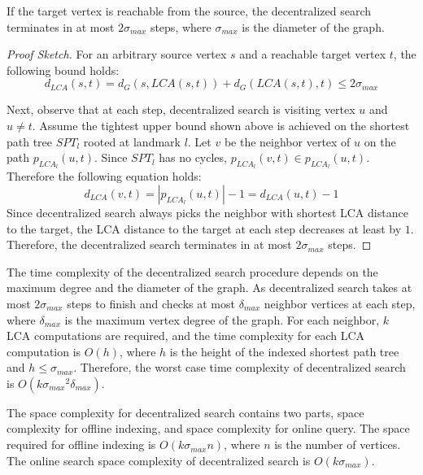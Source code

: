 \begin{theorem}
\label{theorem:max_step}
If the target vertex is reachable from the source, the decentralized search terminates in at most $2{\sigma}_{max}$ steps, where ${\sigma}_{max}$ is the diameter of the graph.
\end{theorem}
\begin{proof}[Proof Sketch]
For an arbitrary source vertex $s$ and a reachable target vertex $t$, the following bound holds:
\[
    d_{LCA}(s,t) = d_G(s,LCA(s,t)) + d_G(LCA(s,t),t) \leq 2{\sigma}_{max}
\]

Next, observe that at each step, decentralized search is visiting vertex $u$ and $u \neq t$. Assume the tightest upper bound shown above is achieved on the shortest path tree $SPT_l$ rooted at landmark $l$. Let $v$ be the neighbor vertex of $u$ on the path $p_{LCA_l}(u,t)$. Since $SPT_l$ has no cycles, $p_{LCA_l}(v,t) \in p_{LCA_l}(u,t)$. Therefore the following equation holds:
\[
		d_{LCA}(v,t) = |p_{LCA_l}(u,t)| - 1 = d_{LCA}(u,t) - 1
\]
Since decentralized search always picks the neighbor with shortest LCA distance to the target, the LCA distance to the target at each step decreases at least by $1$. Therefore, the decentralized search terminates in at most $2{\sigma}_{max}$ steps.
\end{proof}

The time complexity of the decentralized search procedure depends on the maximum degree and the diameter of the graph. As decentralized search takes at most $2{\sigma}_{max}$ steps to finish and checks at most ${\delta}_{max}$ neighbor vertices at each step, where ${\delta}_{max}$ is the maximum vertex degree of the graph. For each neighbor, $k$ LCA computations are required, and the time complexity for each LCA computation is $O(h)$,
where $h$ is the height of the indexed shortest path tree and $h \leq {\sigma}_{max}$. Therefore, the worst case time complexity of decentralized search is $O(k{{\sigma}_{max}}^2{\delta}_{max})$. 

The space complexity for decentralized search contains two parts, space complexity for offline indexing, and space complexity for online query. The space required for offline indexing is $O(k{\sigma}_{max}n)$, where $n$ is the number of vertices. 
The online search space complexity of decentralized search is $O(k{\sigma}_{max})$.

